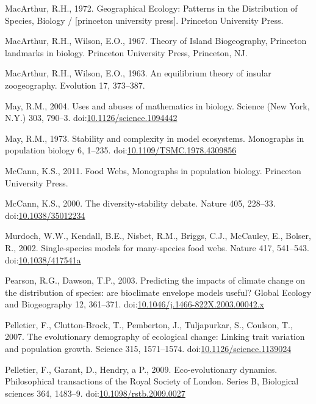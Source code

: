 \hypertarget{ref-macarthur1972geographical}{}
MacArthur, R.H., 1972. Geographical Ecology: Patterns in the
Distribution of Species, Biology / {[}princeton university press{]}.
Princeton University Press.

\hypertarget{ref-MacArthur1967}{}
MacArthur, R.H., Wilson, E.O., 1967. Theory of Island Biogeography,
Princeton landmarks in biology. Princeton University Press, Princeton,
NJ.

\hypertarget{ref-MacArthur1963}{}
MacArthur, R.H., Wilson, E.O., 1963. An equilibrium theory of insular
zoogeography. Evolution 17, 373--387.

\hypertarget{ref-May2004}{}
May, R.M., 2004. Uses and abuses of mathematics in biology. Science (New
York, N.Y.) 303, 790--3.
doi:\href{https://doi.org/10.1126/science.1094442}{10.1126/science.1094442}

\hypertarget{ref-May1973}{}
May, R.M., 1973. Stability and complexity in model ecosystems.
Monographs in population biology 6, 1--235.
doi:\href{https://doi.org/10.1109/TSMC.1978.4309856}{10.1109/TSMC.1978.4309856}

\hypertarget{ref-mccann2011food}{}
McCann, K.S., 2011. Food Webs, Monographs in population biology.
Princeton University Press.

\hypertarget{ref-McCann2000}{}
McCann, K.S., 2000. The diversity-stability debate. Nature 405, 228--33.
doi:\href{https://doi.org/10.1038/35012234}{10.1038/35012234}

\hypertarget{ref-Murdoch2002}{}
Murdoch, W.W., Kendall, B.E., Nisbet, R.M., Briggs, C.J., McCauley, E.,
Bolser, R., 2002. Single-species models for many-species food webs.
Nature 417, 541--543.
doi:\href{https://doi.org/10.1038/417541a}{10.1038/417541a}

\hypertarget{ref-Pearson2003}{}
Pearson, R.G., Dawson, T.P., 2003. Predicting the impacts of climate
change on the distribution of species: are bioclimate envelope models
useful? Global Ecology and Biogeography 12, 361--371.
doi:\href{https://doi.org/10.1046/j.1466-822X.2003.00042.x}{10.1046/j.1466-822X.2003.00042.x}

\hypertarget{ref-Pelletier2007}{}
Pelletier, F., Clutton-Brock, T., Pemberton, J., Tuljapurkar, S.,
Coulson, T., 2007. The evolutionary demography of ecological change:
Linking trait variation and population growth. Science 315, 1571--1574.
doi:\href{https://doi.org/10.1126/science.1139024}{10.1126/science.1139024}

\hypertarget{ref-Pelletier2009}{}
Pelletier, F., Garant, D., Hendry, a P., 2009. Eco-evolutionary
dynamics. Philosophical transactions of the Royal Society of London.
Series B, Biological sciences 364, 1483--9.
doi:\href{https://doi.org/10.1098/rstb.2009.0027}{10.1098/rstb.2009.0027}

